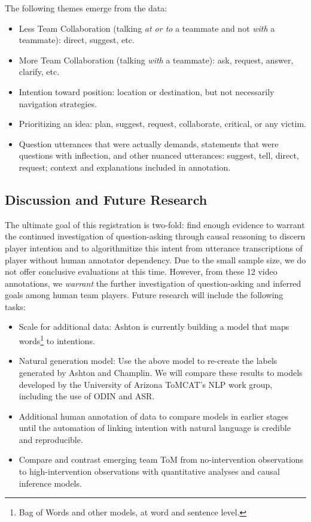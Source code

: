 The following themes emerge from the data:
\begin{itemize}
    \item Less Team Collaboration (talking \emph{at or to} a teammate and not \emph{with} a teammate): direct, suggest, etc.
    \item More Team Collaboration (talking \emph{with} a teammate): ask, request, answer, clarify, etc.
    \item Intention toward position: location or destination, but not necessarily navigation strategies.
    \item Prioritizing an idea: plan, suggest, request, collaborate, critical, or any victim.
    \item Question utterances that were actually demands, statements that were questions with inflection, and other nuanced utterances: suggest, tell, direct, request; context and explanations included in annotation.
\end{itemize}


\subsection{Discussion and Future Research}

The ultimate goal of this registration is two-fold: find enough evidence to warrant the continued investigation of question-asking through causal reasoning to discern player intention and to algorithmitize this intent from utterance transcriptions of player without human annotator dependency. Due to the small sample size, we do not offer conclusive evaluations at this time. However, from these 12 video annotations, we \emph{warrant} the further investigation of question-asking and inferred goals among human team players.
\vspace{15pt}
Future research will include the following tasks:
\begin{itemize}
    \item Scale for additional data: Ashton is currently building a model that maps words\footnote{Bag of Words and other models, at word and sentence level.} to intentions.
    \item Natural generation model: Use the above model to re-create the labels generated by Ashton and Champlin. We will compare these results to models developed by the University of Arizona ToMCAT's NLP work group, including the use of ODIN and ASR.
    \item Additional human annotation of data to compare models in earlier stages until the automation of linking intention with natural language is credible and reproducible.
    \item Compare and contrast emerging team ToM from no-intervention observations to high-intervention observations with quantitative analyses and causal inference models.
\end{itemize}

